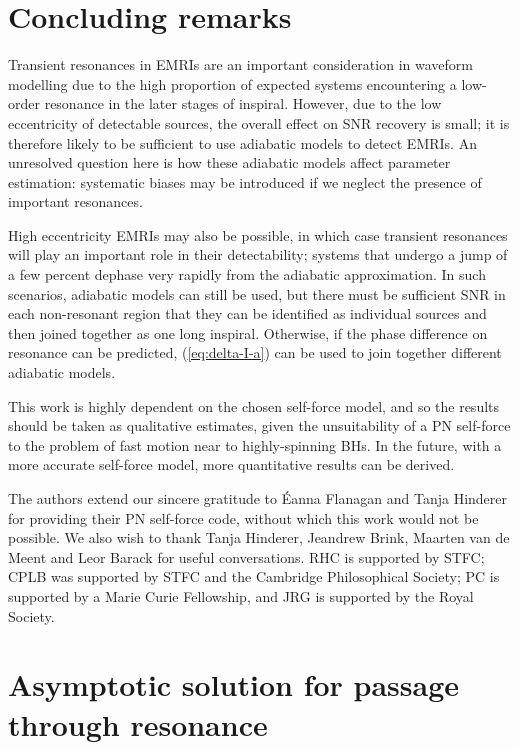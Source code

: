 \documentclass[aps,prd,amsfonts,amssymb,amsmath,nofootinbib,reprint,showpacs,superscriptaddress,twocolumn]{revtex4}
\newcommand{\eqnref}[1]{(\ref{eq:#1})}
\begin{document}
\section{Concluding remarks}
\label{sec:conclusion}

Transient resonances in EMRIs are an important consideration in waveform modelling due to the high proportion of expected systems encountering a low-order resonance in the later stages of inspiral. However, due to the low eccentricity of detectable sources, the overall effect on SNR recovery is small; it is therefore likely to be sufficient to use adiabatic models to detect EMRIs. An unresolved question here is how these adiabatic models affect parameter estimation: systematic biases may be introduced if we neglect the presence of important resonances.

High eccentricity EMRIs may also be possible, in which case transient resonances will play an important role in their detectability; systems that undergo a jump of a few percent dephase very rapidly from the adiabatic approximation. In such scenarios, adiabatic models can still be used, but there must be sufficient SNR in each non-resonant region that they can be identified as individual sources and then joined together as one long inspiral. Otherwise, if the phase difference on resonance can be predicted, \eqnref{delta-I-a} can be used to join together different adiabatic models.

This work is highly dependent on the chosen self-force model, and so the results should be taken as qualitative estimates, given the unsuitability of a PN self-force to the problem of fast motion near to highly-spinning BHs. In the future, with a more accurate self-force model, more quantitative results can be derived.

\begin{acknowledgments}
The authors extend our sincere gratitude to \'{E}anna Flanagan and Tanja Hinderer for providing their PN self-force code, without which this work would not be possible. We also wish to thank Tanja Hinderer, Jeandrew Brink, Maarten van de Meent and Leor Barack for useful conversations. RHC is supported by STFC; CPLB was supported by STFC and the Cambridge Philosophical Society; PC is supported by a Marie Curie Fellowship, and JRG is supported by the Royal Society.
\end{acknowledgments}

\appendix

\section{Asymptotic solution for passage through resonance}\label{sec:res-asymptotic}




\end{document}
